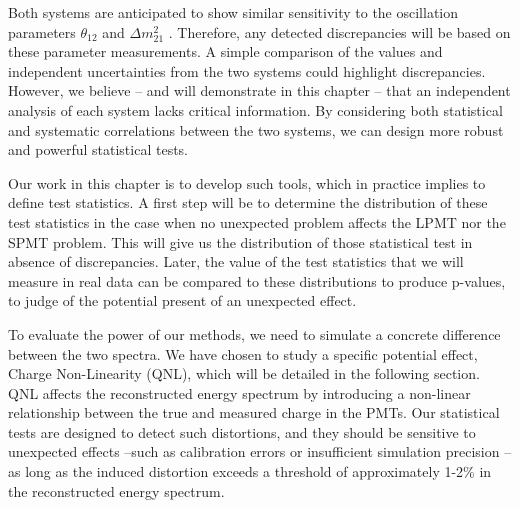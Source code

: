 \documentclass[../main.tex]{subfiles}
\begin{document}
Both systems are anticipated to show similar sensitivity to the oscillation parameters $\theta_{12}$ and $\Delta m^2_{21}$ \cite{juno_collaboration_sub-percent_2022}. Therefore, any detected discrepancies will be based on these parameter measurements. A simple comparison of the values and independent uncertainties from the two systems could highlight discrepancies. However, we believe -- and will demonstrate in this chapter -- that an independent analysis of each system lacks critical information. By considering both statistical and systematic correlations between the two systems, we can design more robust and powerful statistical tests.

Our work in this chapter is to develop such tools, which in practice implies to define test statistics. A first step will be to determine the distribution of these test statistics in the case  when no unexpected problem affects the LPMT nor the SPMT problem. This will give us the distribution of those statistical test in absence of discrepancies. Later, the value of the test statistics that we will measure in real data can be compared to these distributions to produce p-values, to judge of the potential present of an unexpected effect.

To evaluate the power of our methods, we need to simulate a concrete difference between the two spectra.
We have chosen to study a specific potential effect, Charge Non-Linearity (QNL), which will be detailed in the following section. QNL affects the reconstructed energy spectrum by introducing a non-linear relationship between the true and measured charge in the PMTs. Our statistical tests are designed to detect such distortions, and they should be sensitive to unexpected effects --such as calibration errors or insufficient simulation precision -- as long as the induced distortion exceeds a threshold of approximately 1-2\% in the reconstructed energy spectrum.
\end{document}
